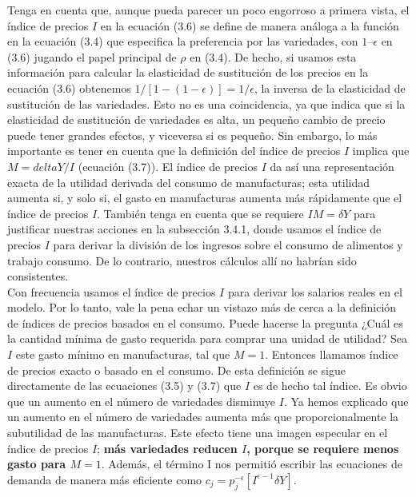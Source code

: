 Tenga en cuenta que, aunque pueda parecer un poco engorroso a primera vista, el índice de precios $I$ en la ecuación (3.6) se define de manera análoga a la función en la ecuación (3.4) que especifica la preferencia por las variedades, con $1 – \epsilon$ en (3.6) jugando el papel principal de $\rho$ en (3.4). De hecho, si usamos esta información para calcular la elasticidad de sustitución de los precios en la ecuación (3.6) obtenemos $1/[1 - (1 - \epsilon)] = 1/\epsilon$, la inversa de la elasticidad de sustitución de las variedades. Esto no es una coincidencia, ya que indica que si la elasticidad de sustitución de variedades es alta, un pequeño cambio de precio puede tener grandes efectos, y viceversa si es pequeño. Sin embargo, lo más importante es tener en cuenta que la definición del índice de precios $I$ implica que $M = delta Y/I$ (ecuación (3.7)). El índice de precios $I$ da así una representación exacta de la utilidad derivada del consumo de manufacturas; esta utilidad aumenta si, y solo si, el gasto en manufacturas aumenta más rápidamente que el índice de precios $I$. También tenga en cuenta que se requiere $IM = \delta Y$ para justificar nuestras acciones en la subsección 3.4.1, donde usamos el índice de precios $I$ para derivar la división de los ingresos sobre el consumo de alimentos y trabajo consumo. De lo contrario, nuestros cálculos allí no habrían sido consistentes.\\
Con frecuencia usamos el índice de precios $I$ para derivar los salarios reales en el modelo. Por lo tanto, vale la pena echar un vistazo más de cerca a la definición de índices de precios basados en el consumo. Puede hacerse la pregunta ¿Cuál es la cantidad mínima de gasto requerida para comprar una unidad de utilidad? Sea $I$ este gasto mínimo en manufacturas, tal que $M =1$. Entonces llamamos índice de precios exacto o basado en el consumo. De esta definición se sigue directamente de las ecuaciones (3.5) y (3.7) que $I$ es de hecho tal índice. Es obvio que un aumento en el número de variedades disminuye $I$. Ya hemos explicado que un aumento en el número de variedades aumenta más que proporcionalmente la subutilidad de las manufacturas. Este efecto tiene una imagen especular en el índice de precios $I$; \textbf{\boldmath más variedades reducen $I$, porque se requiere menos gasto para $M = 1$}. Además, el término I nos permitió escribir las ecuaciones de demanda de manera más eficiente como $c_j =  p_j^{-\epsilon} [I^{\epsilon-1} \delta Y]$.\\
